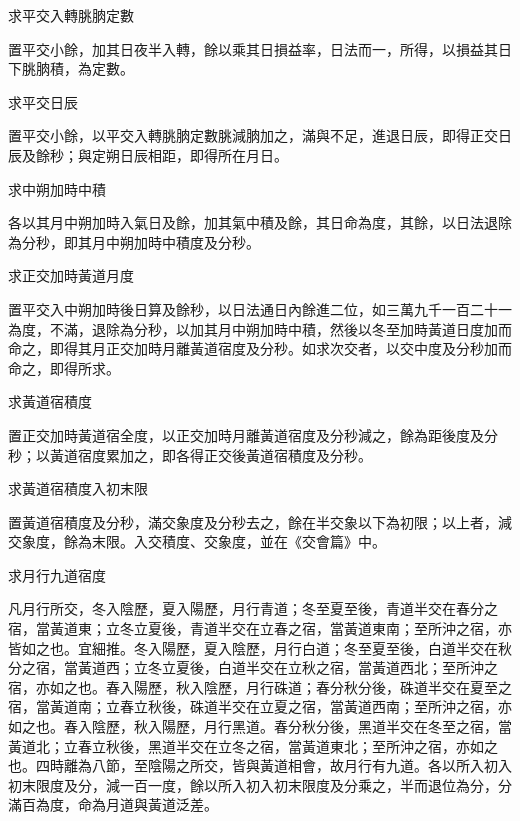 \begin{pinyinscope}
 求平交入轉朓朒定數



 置平交小餘，加其日夜半入轉，餘以乘其日損益率，日法而一，所得，以損益其日下朓朒積，為定數。



 求平交日辰



 置平交小餘，以平交入轉朓朒定數朓減朒加之，滿與不足，進退日辰，即得正交日辰及餘秒；與定朔日辰相距，即得所在月日。



 求中朔加時中積



 各以其月中朔加時入氣日及餘，加其氣中積及餘，其日命為度，其餘，以日法退除為分秒，即其月中朔加時中積度及分秒。



 求正交加時黃道月度



 置平交入中朔加時後日算及餘秒，以日法通日內餘進二位，如三萬九千一百二十一為度，不滿，退除為分秒，以加其月中朔加時中積，然後以冬至加時黃道日度加而命之，即得其月正交加時月離黃道宿度及分秒。如求次交者，以交中度及分秒加而命之，即得所求。



 求黃道宿積度



 置正交加時黃道宿全度，以正交加時月離黃道宿度及分秒減之，餘為距後度及分秒；以黃道宿度累加之，即各得正交後黃道宿積度及分秒。



 求黃道宿積度入初末限



 置黃道宿積度及分秒，滿交象度及分秒去之，餘在半交象以下為初限；以上者，減交象度，餘為末限。入交積度、交象度，並在《交會篇》中。



 求月行九道宿度



 凡月行所交，冬入陰歷，夏入陽歷，月行青道；冬至夏至後，青道半交在春分之宿，當黃道東；立冬立夏後，青道半交在立春之宿，當黃道東南；至所沖之宿，亦皆如之也。宜細推。冬入陽歷，夏入陰歷，月行白道；冬至夏至後，白道半交在秋分之宿，當黃道西；立冬立夏後，白道半交在立秋之宿，當黃道西北；至所沖之宿，亦如之也。春入陽歷，秋入陰歷，月行硃道；春分秋分後，硃道半交在夏至之宿，當黃道南；立春立秋後，硃道半交在立夏之宿，當黃道西南；至所沖之宿，亦如之也。春入陰歷，秋入陽歷，月行黑道。春分秋分後，黑道半交在冬至之宿，當黃道北；立春立秋後，黑道半交在立冬之宿，當黃道東北；至所沖之宿，亦如之也。四時離為八節，至陰陽之所交，皆與黃道相會，故月行有九道。各以所入初入初末限度及分，減一百一度，餘以所入初入初末限度及分乘之，半而退位為分，分滿百為度，命為月道與黃道泛差。




\end{pinyinscope}
